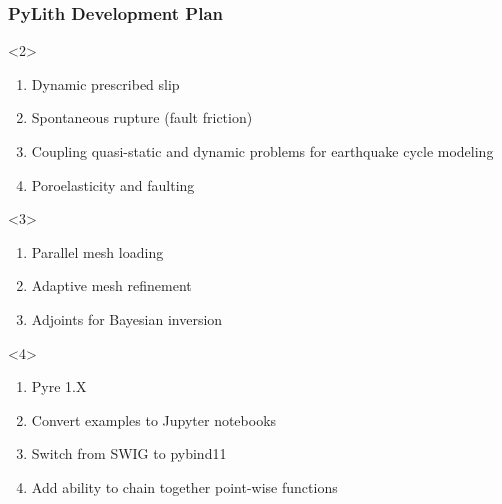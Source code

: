 \documentclass[aspectratio=169]{beamer}
\begin{document}
\begin{frame}[t]
  \frametitle{PyLith Development Plan}
  \summary{}

  \begin{itemize}
    \begin{onlyenv}<2>
      \begin{enumerate}
      \item Dynamic prescribed slip
      \item Spontaneous rupture (fault friction)
      \item Coupling quasi-static and dynamic problems for earthquake cycle modeling
      \item Poroelasticity and faulting
      \end{enumerate}
    \end{onlyenv}
    \begin{onlyenv}<3>
      \begin{enumerate}
      \item Parallel mesh loading
      \item Adaptive mesh refinement
      \item Adjoints for Bayesian inversion
      \end{enumerate}
    \end{onlyenv}
    \begin{onlyenv}<4>
      \begin{enumerate}
      \item Pyre 1.X
      \item Convert examples to Jupyter notebooks
      \item Switch from SWIG to pybind11
      \item Add ability to chain together point-wise functions
      \end{enumerate}
    \end{onlyenv}
  \end{itemize}
  
\end{frame}

\end{document}
